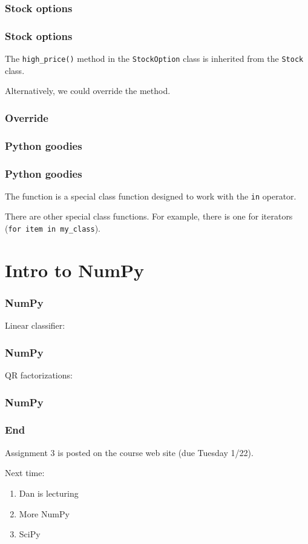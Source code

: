 \documentclass{beamer}
\begin{document}
\begin{frame}
\frametitle{Stock options}
\end{frame}

\begin{frame}
\frametitle{Stock options}
The \texttt{high\_price()} method in the \texttt{StockOption} class is inherited from the \texttt{Stock} class.

\vspace{0.2in}
Alternatively, we could override the method.
\end{frame}

\begin{frame}
\frametitle{Override}
\end{frame}

\begin{frame}
\frametitle{Python goodies}
\end{frame}

\begin{frame}
\frametitle{Python goodies}
The  function is a special class function designed to work with the \texttt{in} operator.

\vspace{0.2in}

There are other special class functions.  For example, there is one for iterators (\texttt{for item in my\_class}).

\end{frame}


\section{Intro to NumPy}

\begin{frame}
\frametitle{NumPy}
\end{frame}


\begin{frame}
Linear classifier:
\frametitle{NumPy}
\end{frame}


\begin{frame}
QR factorizations:
\frametitle{NumPy}
\end{frame}

\begin{frame}
\frametitle{End}

Assignment 3 is posted on the course web site (due Tuesday 1/22).

\vspace{0.2in}

Next time:
\begin{enumerate}
\setlength{\itemsep}{0.05in}
\item{Dan is lecturing}
\item{More NumPy}
\item{SciPy}
\end{enumerate}

\end{frame}
\end{document}

